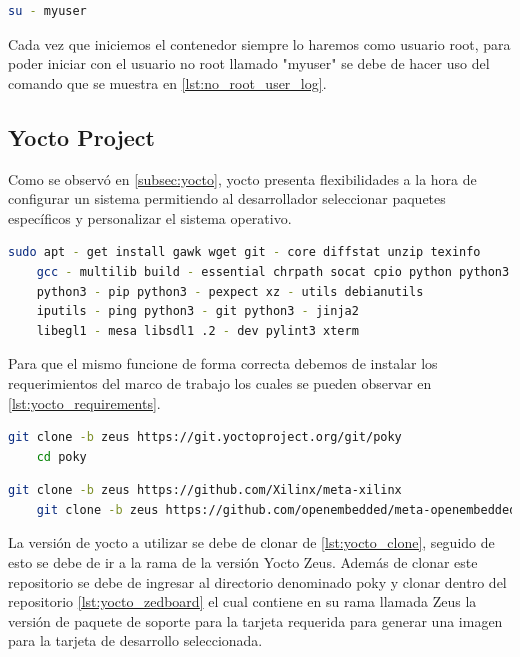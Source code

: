 \begin{lstlisting}[language=bash, caption={Iniciar usuario no root, Linux}, label=lst:no_root_user_log]
    su - myuser
\end{lstlisting}


Cada vez que iniciemos el contenedor siempre lo haremos como usuario root, para poder iniciar con el usuario no root llamado "myuser" se debe de hacer uso del comando que se muestra en \ref{lst:no_root_user_log}.

\subsection{Yocto Project}

Como se observó en \ref{subsec:yocto}, yocto presenta flexibilidades a la hora de configurar un sistema permitiendo al desarrollador seleccionar paquetes específicos y personalizar el sistema operativo.

\begin{lstlisting}[language=bash, caption={Requerimientos Yocto Zeus, Linux}, label=lst:yocto_requirements]
    sudo apt - get install gawk wget git - core diffstat unzip texinfo
    gcc - multilib build - essential chrpath socat cpio python python3
    python3 - pip python3 - pexpect xz - utils debianutils 
    iputils - ping python3 - git python3 - jinja2 
    libegl1 - mesa libsdl1 .2 - dev pylint3 xterm
\end{lstlisting}

Para que el mismo funcione de forma correcta debemos de instalar los requerimientos del marco de trabajo los cuales se pueden observar en \ref{lst:yocto_requirements}.

\begin{lstlisting}[language=bash, caption={Version de Yocto}, label=lst:yocto_clone]
    git clone -b zeus https://git.yoctoproject.org/git/poky
    cd poky
\end{lstlisting}

\begin{lstlisting}[language=bash, caption={BSP para Zedboard}, label=lst:yocto_zedboard]
    git clone -b zeus https://github.com/Xilinx/meta-xilinx
    git clone -b zeus https://github.com/openembedded/meta-openembedded.git
\end{lstlisting}

La versión de yocto a utilizar se debe de clonar de \ref{lst:yocto_clone}, seguido de esto se debe de ir a la rama de la versión Yocto Zeus. Además de clonar este repositorio se debe de ingresar al directorio denominado poky y clonar dentro del repositorio \ref{lst:yocto_zedboard} el cual contiene en su rama llamada Zeus la versión de paquete de soporte para la tarjeta requerida para generar una imagen para la tarjeta de desarrollo seleccionada.

